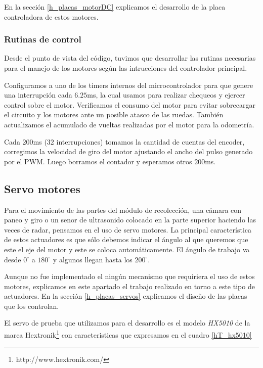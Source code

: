 En la secci\'on \ref{h_placas_motorDC} explicamos el desarrollo de la placa controladora de estos motores.

\subsubsection{Rutinas de control}
\label{h_actuadores_motorDC_rutinas}

Desde el punto de vista del c\'odigo, tuvimos que desarrollar las rutinas necesarias para el manejo de los motores seg\'un las intrucciones del
controlador principal.

Configuramos a uno de los timers internos del microcontrolador para que genere una interrupci\'on cada $6.25$ms, la cual usamos para realizar
chequeos y ejercer control sobre el motor.
Verificamos el consumo del motor para evitar sobrecargar el circuito y los motores ante un posible atasco de las ruedas.
Tambi\'en actualizamos el acumulado de vueltas realizadas por el motor para la odometr\'ia.

Cada $200$ms ($32$ interrupciones) tomamos la cantidad de cuentas del encoder, corregimos la velocidad de giro del motor ajustando el
ancho del pulso generado por el PWM.
Luego borramos el contador y esperamos otros $200$ms.

\subsection{Servo motores}
\label{h_actuadores_servo}

Para el movimiento de las partes del m\'odulo de recolecci\'on, una c\'amara con paneo y giro o un senor de ultrasonido colocado
en la parte superior haciendo las veces de radar, pensamos en el uso de servo motores.
La principal caracter\'istica de estos actuadores es que s\'olo debemos indicar el \'angulo al que queremos que este
el eje del motor y este se coloca autom\'aticamente.
El \'angulo de trabajo va desde $0^{\circ}$ a $180^{\circ}$ y algunos llegan hasta los $200^{\circ}$.

Aunque no fue implementado el ning\'un mecanismo que requiriera el uso de estos motores, explicamos en este apartado el trabajo realizado
en torno a este tipo de actuadores.
En la secci\'on \ref{h_placas_servos} explicamos el dise\~no de las placas que los controlan.

El servo de prueba que utilizamos para el desarrollo es el modelo \emph{HX5010} de la marca Hextronik\footnote{http://www.hextronik.com/}
con caracteristicas que expresamos en el cuadro \ref{hT_hx5010}

